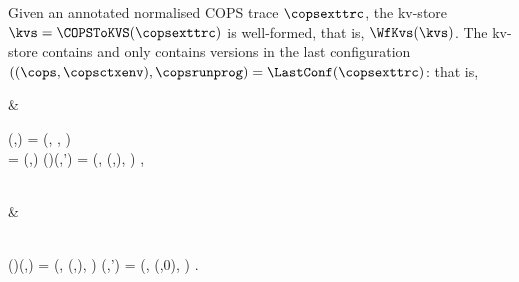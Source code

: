 \label{sec:cops-well-formed-encoded-kv-store}
\begin{proposition}
\label{prop:cops-well-formed-kvs}
Given an annotated normalised COPS trace \( \copsexttrc \),
the kv-store \( \kvs = \COPSToKVS(\copsexttrc) \) is well-formed,
that is, \( \WfKvs(\kvs) \).
The kv-store contains and only contains versions 
in the last configuration \( ((\cops,\copsctxenv),\copsrunprog) = \LastConf(\copsexttrc) \):
that is,
\begin{Formulae}
& \begin{Formula}
    \Forall{\key \in \Keys | \idx \in \Indexs | \val \in \Values | \copstxid \in \COPSTxIDs }
    \kvs(\key,\idx) = (\val, \copstxid, \stub )
    \\ \implies 
    \copstxid = \copstxid[\stub][\repl](\ts,\stub)
    \cops(\repl)(\key,\idx') = (\val, (\ts,\repl), \stub ) ,
    \label{equ:versions-in-merged-cops-to-replicas}
\end{Formula}
\\ & \begin{Formula}
    \Forall{\key \in \Keys | \idx \in \Indexs | \val \in \Values | \repl, \ts}
    \\ \cops(\repl)(\key,\idx) = (\val, (\ts,\repl), \stub ) 
    \implies 
    \kvs(\key,\idx') = (\val, \copstxid[\cl][\repl](\ts,0), \stub ) .
    \label{equ:versions-in-replicas-to-merged-cops}
\end{Formula}
\end{Formulae}
\end{proposition}
